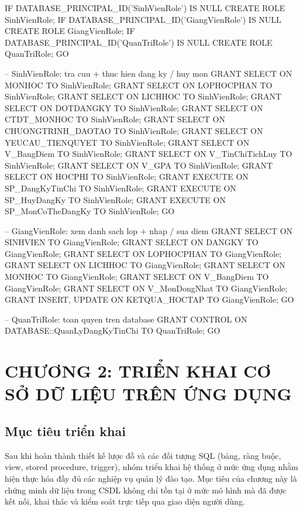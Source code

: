 \documentclass[13pt, a4paper]{article}
\begin{document}
\begin{sqlbox}
IF DATABASE_PRINCIPAL_ID('SinhVienRole')  IS NULL CREATE ROLE SinhVienRole;
IF DATABASE_PRINCIPAL_ID('GiangVienRole') IS NULL CREATE ROLE GiangVienRole;
IF DATABASE_PRINCIPAL_ID('QuanTriRole')   IS NULL CREATE ROLE QuanTriRole;
GO

-- SinhVienRole: tra cuu + thuc hien dang ky / huy mon
GRANT SELECT ON MONHOC              TO SinhVienRole;
GRANT SELECT ON LOPHOCPHAN          TO SinhVienRole;
GRANT SELECT ON LICHHOC             TO SinhVienRole;
GRANT SELECT ON DOTDANGKY           TO SinhVienRole;
GRANT SELECT ON CTDT_MONHOC         TO SinhVienRole;
GRANT SELECT ON CHUONGTRINH_DAOTAO  TO SinhVienRole;
GRANT SELECT ON YEUCAU_TIENQUYET    TO SinhVienRole;
GRANT SELECT ON V_BangDiem          TO SinhVienRole;
GRANT SELECT ON V_TinChiTichLuy     TO SinhVienRole;
GRANT SELECT ON V_GPA               TO SinhVienRole;
GRANT SELECT ON HOCPHI              TO SinhVienRole;
GRANT EXECUTE ON SP_DangKyTinChi    TO SinhVienRole;
GRANT EXECUTE ON SP_HuyDangKy       TO SinhVienRole;
GRANT EXECUTE ON SP_MonCoTheDangKy  TO SinhVienRole;
GO

-- GiangVienRole: xem danh sach lop + nhap / sua diem
GRANT SELECT ON SINHVIEN            TO GiangVienRole;
GRANT SELECT ON DANGKY              TO GiangVienRole;
GRANT SELECT ON LOPHOCPHAN          TO GiangVienRole;
GRANT SELECT ON LICHHOC             TO GiangVienRole;
GRANT SELECT ON MONHOC              TO GiangVienRole;
GRANT SELECT ON V_BangDiem          TO GiangVienRole;
GRANT SELECT ON V_MonDongNhat       TO GiangVienRole;
GRANT INSERT, UPDATE ON KETQUA_HOCTAP TO GiangVienRole;
GO

-- QuanTriRole: toan quyen tren database
GRANT CONTROL ON DATABASE::QuanLyDangKyTinChi TO QuanTriRole;
GO
\end{sqlbox}

\newpage
\section{CHƯƠNG 2: TRIỂN KHAI CƠ SỞ DỮ LIỆU TRÊN ỨNG DỤNG}

\subsection{Mục tiêu triển khai}

\noindent Sau khi hoàn thành thiết kế lược đồ và các đối tượng SQL (bảng, ràng buộc, view, stored procedure, trigger), nhóm triển khai hệ thống ở mức ứng dụng nhằm hiện thực hóa đầy đủ các nghiệp vụ quản lý đào tạo. Mục tiêu của chương này là chứng minh dữ liệu trong CSDL không chỉ tồn tại ở mức mô hình mà đã được kết nối, khai thác và kiểm soát trực tiếp qua giao diện người dùng.
\end{document}
